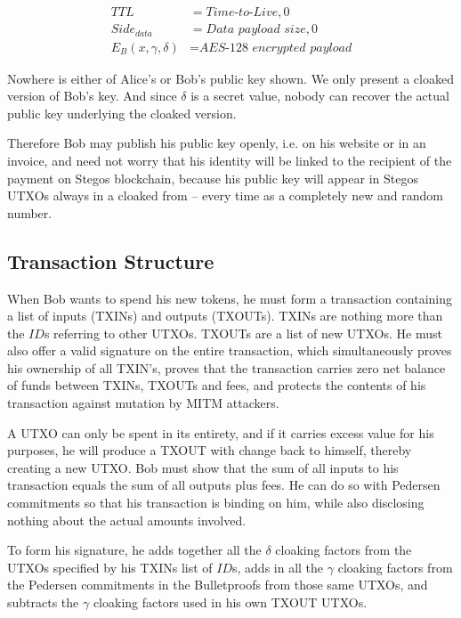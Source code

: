 \documentclass[a4paper, 10pt, conference]{ieeeconf}
\begin{document}
\begin{align*}
TTL &= \textit{Time-to-Live}, 0 \\
Side_{data} &= \textit{Data payload size}, 0 \\
E_B(x, \gamma, \delta) &= \textit{AES-128 encrypted payload}
\end{align*}

Nowhere is either of Alice's or Bob's public key shown. We only present a cloaked version of Bob's key. And since $\delta$ is a secret value, nobody can recover the actual public key underlying the cloaked version. 

Therefore Bob may publish his public key openly, i.e. on his website or in an invoice, and need not worry that his identity will be linked to the recipient of the payment on Stegos blockchain, because his public key will appear in Stegos UTXOs always in a cloaked from -- every time as a completely new and random number.

\subsection{Transaction Structure}

When Bob wants to spend his new tokens, he must form a transaction containing a list of inputs (TXINs) and outputs (TXOUTs). TXINs are nothing more than the $\mathit{ID}$s referring to other UTXOs. TXOUTs are a list of new UTXOs. He must also offer a valid signature on the entire transaction, which simultaneously proves his ownership of all TXIN's, proves that the transaction carries zero net balance of funds between TXINs, TXOUTs and fees, and protects the contents of his transaction against mutation by MITM attackers.

A UTXO can only be spent in its entirety, and if it carries excess value for his purposes, he will produce a TXOUT with change back to himself, thereby creating a new UTXO. Bob must show that the sum of all inputs to his transaction equals the sum of all outputs plus fees. He can do so with Pedersen commitments so that his transaction is binding on him, while also disclosing nothing about the actual amounts involved.

To form his signature, he adds together all the $\delta$ cloaking factors from the UTXOs specified by his TXINs list of $\mathit{ID}$s, adds in all the $\gamma$ cloaking factors from the Pedersen commitments in the Bulletproofs from those same UTXOs, and subtracts the $\gamma$ cloaking factors used in his own TXOUT UTXOs. 
\end{document}
